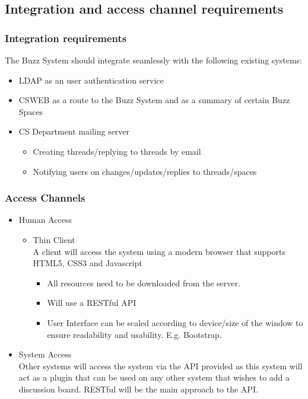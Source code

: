 
\subsection{Integration and access channel requirements}
	\subsubsection{Integration requirements}
		The Buzz System should integrate seamlessly with the following existing systems:		
		\begin{itemize}
			\item LDAP as an user authentication service
			\item CSWEB as a route to the Buzz System and as a summary of certain Buzz Spaces
			\item CS Department mailing server
				\begin{itemize}
					\item Creating threads/replying to threads by email 
					\item Notifying users on changes/updates/replies to threads/spaces
				\end{itemize}
		\end{itemize}
	\subsubsection{Access Channels}
		\begin{itemize}
			\item Human Access
				\begin{itemize}
					\item Thin Client\\
					A client will access the system using a modern browser that supports HTML5, CSS3 and Javascript 
						\begin{itemize}
							\item All resources need to be downloaded from the server.
							\item Will use a RESTful API 
							\item User Interface can be scaled according to device/size of the window to ensure readability and usability. E.g. Bootstrap.
						\end{itemize}
				\end{itemize}
			\item System Access\\
			Other systems will access the system via the API provided as this system will act as a plugin that can be used on any other system that wishes to add a discussion board. RESTful will be the main approach to the API.
		\end{itemize}